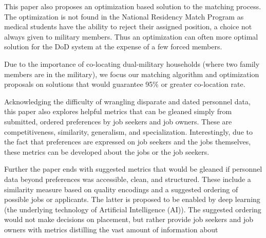 This paper also proposes an optimization based solution to the matching process. The optimization is not found in the National Residency Match Program as medical students have the ability to reject their assigned position, a choice not always given to military members. Thus an optimization can often more optimal solution for the DoD system at the expense of a few forced members.
 
Due to the importance of co-locating dual-military households (where two family members are in the military), we focus our matching algorithm and optimization proposals on solutions that would guarantee 95\% or greater co-location rate.

Acknowledging the difficulty of wrangling disparate and dated personnel data, this paper also explores helpful metrics that can be gleaned simply from submitted, ordered preferences by job seekers and job owners. These are competitiveness, similarity, generalism, and specialization. Interestingly, due to the fact that preferences are expressed on job seekers and the jobs themselves, these metrics can be developed about the jobs or the job seekers.
 
Further the paper ends with suggested metrics that would be gleaned if personnel data beyond preferences was accessible, clean, and structured. These include a similarity measure based on quality encodings and a suggested ordering of possible jobs or applicants. The latter is proposed to be enabled by deep learning (the underlying technology of Artificial Intelligence (AI)). The suggested ordering would not make decisions on placement, but rather provide job seekers and job owners with metrics distilling the vast amount of information about
